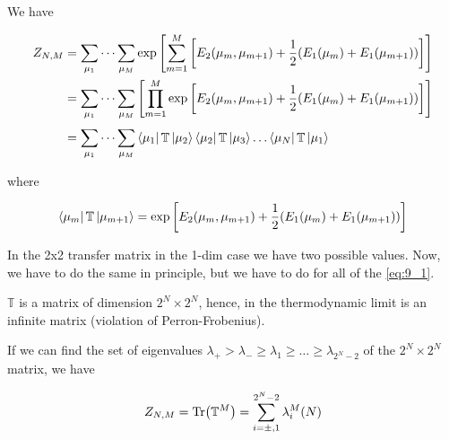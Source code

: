 \documentclass[../../Main/Main.tex]{subfiles}
\begin{document}
We have

\begin{equation}
\begin{split}
Z_{N,M}  &= \sum_{\mu_1}^{} \dots \sum_{\mu_M}^{} \exp \qty[ \sum_{m=1}^{M} \qty[E_2(\mu _m, \mu _{m+1}) + \frac{1}{2}(E_1(\mu _m) + E_1(\mu _{m+1}))]] \\
&= \sum_{\mu_1}^{} \dots \sum_{\mu_M}^{}  \qty[ \prod_{m=1}^{M} \exp  \qty[E_2(\mu _m, \mu _{m+1}) + \frac{1}{2}(E_1(\mu _m) + E_1(\mu _{m+1}))]] \\
& =  \sum_{\mu_1}^{} \dots \sum_{\mu_M}^{} \bra{\mu_1} \mathbb{T} \ket{\mu_2} \bra{\mu_2}  \mathbb{T} \ket{\mu_3} \dots \bra{\mu_N}  \mathbb{T} \ket{\mu_1}
\end{split}
\end{equation}

where

\begin{equation}
  \bra{\mu _m} \mathbb{T} \ket{\mu _{m+1}} = \exp \qty[E_2(\mu _m, \mu _{m+1}) + \frac{1}{2}(E_1(\mu _m) + E_1(\mu _{m+1}))]
  \label{eq:9_2}
\end{equation}


\begin{remark}
In the 2x2 transfer matrix in the 1-dim case we have two possible values. Now, we have to do the same in principle, but we have to do for all of the \eqref{eq:9_1}.
\end{remark}
\begin{remark}
\( \mathbb{T} \) is a matrix of dimension \( 2^N \times 2^N \), hence, in the thermodynamic limit is an infinite matrix (violation of Perron-Frobenius).
\end{remark}




 If we can find the set of eigenvalues \( \lambda _+ > \lambda _- \ge \lambda _1 \ge \dots \ge \lambda _{2^N-2} \) of the  \( 2^N \times 2^N \) matrix, we have

\begin{equation}
      Z_{N,M}  = \Tr(\mathbb{T}^M) = \sum_{i= \pm, 1}^{ 2^N-2} \lambda _i^{M}(N)
\end{equation}

\end{document}
